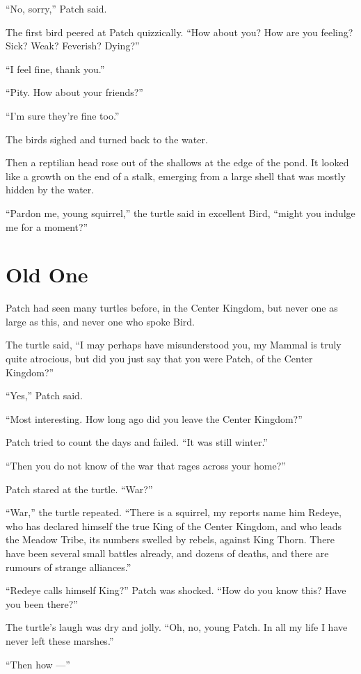 \documentclass[ebook,oneside,openany,12pt]{memoir}
\begin{document}
“No, sorry,” Patch said.

The first bird peered at Patch quizzically. “How about you? How are
you feeling? Sick? Weak? Feverish? Dying?”

“I feel fine, thank you.”

“Pity. How about your friends?”

“I’m sure they’re fine too.”

The birds sighed and turned back to the water.

Then a reptilian head rose out of the shallows at the edge of the
pond. It looked like a growth on the end of a stalk, emerging from a
large shell that was mostly hidden by the water.

“Pardon me, young squirrel,” the turtle said in excellent Bird, “might
you indulge me for a moment?”


\section{Old One}

Patch had seen many turtles before, in the Center Kingdom, but never
one as large as this, and never one who spoke Bird.

The turtle said, “I may perhaps have misunderstood you, my Mammal is
truly quite atrocious, but did you just say that you were Patch, of
the Center Kingdom?”

“Yes,” Patch said.

“Most interesting. How long ago did you leave the Center Kingdom?”

Patch tried to count the days and failed. “It was still winter.”

“Then you do not know of the war that rages across your home?”

Patch stared at the turtle. “War?”

“War,” the turtle repeated. “There is a squirrel, my reports name him
Redeye, who has declared himself the true King of the Center Kingdom,
and who leads the Meadow Tribe, its numbers swelled by rebels, against
King Thorn. There have been several small battles already, and dozens
of deaths, and there are rumours of strange alliances.”

“Redeye calls himself King?” Patch was shocked. “How do you know this?
Have you been there?”

The turtle’s laugh was dry and jolly. “Oh, no, young Patch. In all my
life I have never left these marshes.”

“Then how —”
\end{document}
